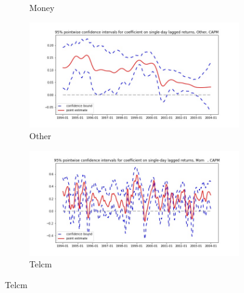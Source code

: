 \documentclass{article}
\begin{document}
\begin{figure}
\begin{subfigure}[b]{0.5\textwidth}
    \caption{Money}
    \label{fig:2}
  \end{subfigure}
  \begin{subfigure}[b]{0.5\textwidth}
    \centering
    \includegraphics[width=\textwidth]{Other/pointwiseCIs_CAPM.jpg}
    \caption{Other}
    \label{fig:2}
  \end{subfigure}
  \begin{subfigure}[b]{0.5\textwidth}
    \centering
    \includegraphics[width=\textwidth]{Mom/pointwiseCIs_CAPM.jpg}
    \caption{Telcm}
    \label{fig:2}
  \end{subfigure}

\end{figure}
\end{document}
